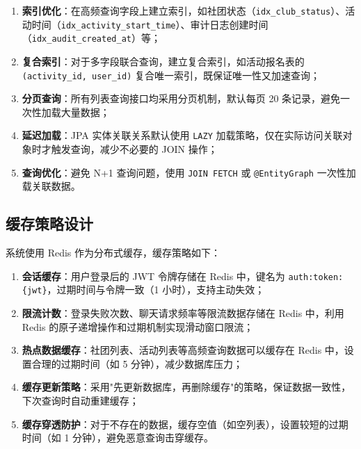 \begin{enumerate}
  \item \textbf{索引优化}：在高频查询字段上建立索引，如社团状态（\texttt{idx\_club\_status}）、活动时间（\texttt{idx\_activity\_start\_time}）、审计日志创建时间（\texttt{idx\_audit\_created\_at}）等；

  \item \textbf{复合索引}：对于多字段联合查询，建立复合索引，如活动报名表的 \texttt{(activity\_id, user\_id)} 复合唯一索引，既保证唯一性又加速查询；

  \item \textbf{分页查询}：所有列表查询接口均采用分页机制，默认每页 20 条记录，避免一次性加载大量数据；

  \item \textbf{延迟加载}：JPA 实体关联关系默认使用 \texttt{LAZY} 加载策略，仅在实际访问关联对象时才触发查询，减少不必要的 JOIN 操作；

  \item \textbf{查询优化}：避免 N+1 查询问题，使用 \texttt{JOIN FETCH} 或 \texttt{@EntityGraph} 一次性加载关联数据。
\end{enumerate}



\subsection{缓存策略设计}

系统使用 Redis 作为分布式缓存，缓存策略如下：

\begin{enumerate}
  \item \textbf{会话缓存}：用户登录后的 JWT 令牌存储在 Redis 中，键名为 \texttt{auth:token:\{jwt\}}，过期时间与令牌一致（1 小时），支持主动失效；

  \item \textbf{限流计数}：登录失败次数、聊天请求频率等限流数据存储在 Redis 中，利用 Redis 的原子递增操作和过期机制实现滑动窗口限流；

  \item \textbf{热点数据缓存}：社团列表、活动列表等高频查询数据可以缓存在 Redis 中，设置合理的过期时间（如 5 分钟），减少数据库压力；

  \item \textbf{缓存更新策略}：采用"先更新数据库，再删除缓存"的策略，保证数据一致性，下次查询时自动重建缓存；

  \item \textbf{缓存穿透防护}：对于不存在的数据，缓存空值（如空列表），设置较短的过期时间（如 1 分钟），避免恶意查询击穿缓存。
\end{enumerate}

